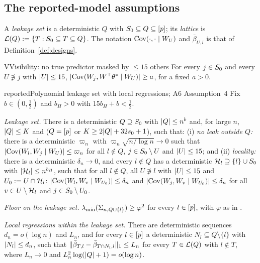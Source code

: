 \subsection{The reported-model assumptions}\label{sec:a-rm}

A \emph{leakage set} is a deterministic $Q$ with $S_0\subseteq Q\subseteq[p]$; its \emph{lattice} is
$\mathcal L(Q):=\{T:S_0\subseteq T\subseteq Q\}$. The notation $\operatorname{Cov}(\cdot,\cdot\mid W_U)$ and $\bar\beta_{U,l}$ is that of
Definition~\ref{def:designs}.

\begin{assumption}{V}{Visibility: no true predictor masked by $\le15$ others}
For every $j\in S_0$ and every $U\not\ni j$ with $\lvert U\rvert\le15$, $\lvert \operatorname{Cov}(W_j,W^\top\theta^*\mid W_U)\rvert\ge a$, for a fixed
$a>0$.
\end{assumption}

\begin{assumption}{reported}{Polynomial leakage set with local regressions; A6 Assumption~4}
Fix $b\in(0,\tfrac12)$ and $b_H>0$ with $15b_H+b<\tfrac12$.
\begin{asmitems}
  \item\label{asm:rr-leak} \emph{Leakage set.} There is a deterministic $Q\supseteq S_0$ with $\lvert Q\rvert\le n^b$ and, for
    large $n$, $\lvert Q\rvert\le K$ and ($Q=[p]$ or $K\ge2\lvert Q\rvert+32s_0+1$), such that: (i) \emph{no leak outside $Q$:}
    there is a deterministic $\varpi_n$ with $\varpi_n\sqrt{n/\log n}\to0$ such that
    $\lvert \operatorname{Cov}(W_l,W_j\mid W_U)\rvert\le\varpi_n$ for all $l\notin Q$, $j\in S_0\setminus U$ and $\lvert U\rvert\le15$; and (ii)
    \emph{locality:} there is a deterministic $\delta_n\to0$, and every $l\notin Q$ has a deterministic
    $\mathcal H_l\supseteq\{l\}\cup S_0$ with $\lvert \mathcal H_l\rvert\le n^{b_H}$, such that for all $l\notin Q$, all $U\not\ni l$ with
    $\lvert U\rvert\le15$ and $U_0:=U\cap\mathcal H_l$: $\lvert \operatorname{Cov}(W_l,W_v\mid W_{U_0})\rvert\le\delta_n$ and
    $\lvert \operatorname{Cov}(W_j,W_v\mid W_{U_0})\rvert\le\delta_n$ for all $v\in U\setminus\mathcal H_l$ and $j\in S_0\setminus U_0$.
  \item\label{asm:rr-floor} \emph{Floor on the leakage set.} $\lambda_{\min}(\Sigma_{n,Q\cup\{l\}})\ge\varphi^2$ for every
    $l\in[p]$, with $\varphi$ as in .
  \item\label{asm:rr-local} \emph{Local regressions within the leakage set.} There are deterministic sequences
    $d_n=o(\log n)$ and $L_n$, and for every $l\in[p]$ a deterministic $N_l\subseteq Q\setminus\{l\}$ with
    $\lvert N_l\rvert\le d_n$, such that $\lVert \bar\beta_{T,l}-\bar\beta_{T\cap N_l,l}\rVert_1\le L_n$ for every $T\in\mathcal L(Q)$ with
    $l\notin T$, where $L_n\to0$ and $L_n^2\log(\lvert Q\rvert+1)=o(\log n)$.
\end{asmitems}
\end{assumption}

